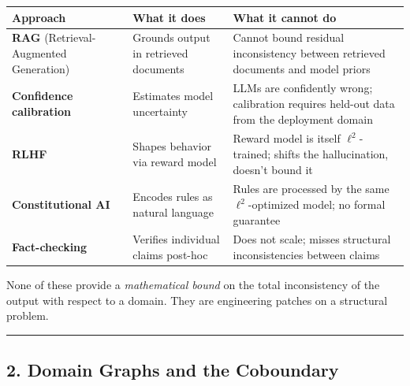 \documentclass[
]{article}
\begin{document}
\begin{longtable}[]{@{}
  >{\raggedright\arraybackslash}p{}
  >{\raggedright\arraybackslash}p{}
  >{\raggedright\arraybackslash}p{}@{}}
\toprule\noalign{}
\begin{minipage}[b]{\linewidth}\raggedright
Approach
\end{minipage} & \begin{minipage}[b]{\linewidth}\raggedright
What it does
\end{minipage} & \begin{minipage}[b]{\linewidth}\raggedright
What it cannot do
\end{minipage} \\
\midrule\noalign{}
\endhead
\bottomrule\noalign{}
\endlastfoot
\textbf{RAG} (Retrieval-Augmented Generation) & Grounds output in
retrieved documents & Cannot bound residual inconsistency between
retrieved documents and model priors \\
\textbf{Confidence calibration} & Estimates model uncertainty & LLMs are
confidently wrong; calibration requires held-out data from the
deployment domain \\
\textbf{RLHF} & Shapes behavior via reward model & Reward model is
itself \(\ell^2\)-trained; shifts the hallucination, doesn't bound it \\
\textbf{Constitutional AI} & Encodes rules as natural language & Rules
are processed by the same \(\ell^2\)-optimized model; no formal
guarantee \\
\textbf{Fact-checking} & Verifies individual claims post-hoc & Does not
scale; misses structural inconsistencies between claims \\
\end{longtable}

None of these provide a \emph{mathematical bound} on the total
inconsistency of the output with respect to a domain. They are
engineering patches on a structural problem.

\begin{center}\rule{0.5\linewidth}{0.5pt}\end{center}

\subsection{2. Domain Graphs and the
Coboundary}\label{domain-graphs-and-the-coboundary}
\end{document}
